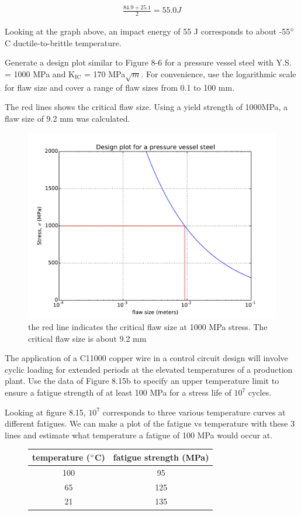 \documentclass[12pt]{article}
\newenvironment{problem}[2][Problem]{\begin{trivlist}
\item[\hskip \labelsep {\bfseries #1}\hskip \labelsep {\bfseries #2.}]}{\end{trivlist}}
\begin{document}
\begin{align*}
\frac{84.9 + 25.1}{2} = 55.0 J
\end{align*}

Looking at the graph above, an impact energy of 55 J corresponds to about -55$\degree$C ductile-to-brittle temperature.

\begin{problem}{8.6}
Generate a design plot similar to Figure 8-6 for a pressure vessel steel with Y.S. = 1000 MPa and $\text{K}_{\text{IC}}$ = 170 MPa$\sqrt{m}$.  For convenience, use the logarithmic scale for flaw size and cover a range of flaw sizes from 0.1 to 100 mm. 
\end{problem}

The red lines shows the critical flaw size. Using a yield strength of 1000MPa, a flaw size of 9.2 mm was calculated.

\begin{figure}[H]
\centering
\includegraphics[width=350pt]{p3.pdf}
\caption{the red line indicates the critical flaw size at 1000 MPa stress. The critical flaw size is about 9.2 mm}
\end{figure}

\begin{problem}{8.25}
The application of a C11000 copper wire in a control circuit design will involve cyclic loading for extended periods at the elevated temperatures of a production plant.  Use the data of Figure 8.15b to specify an upper temperature limit to ensure a fatigue strength of at least 100 MPa for a stress life of $10^7$ cycles.
\end{problem}

Looking at figure 8.15, $10^7$ corresponds to three various temperature curves at different fatigues. We can make a plot of the fatigue vs temperature with these 3 lines and estimate what temperature a fatigue of 100 MPa would occur at.
\begin{figure}[H]
\centering
\begin{tabular}{c | c}
temperature ($\degree$C) & fatigue strength (MPa) \\ \hline
100 & 95 \\ \hline
65 & 125 \\ \hline
21 & 135 \\ \hline
\end{tabular}
\end{figure}
\end{document}
